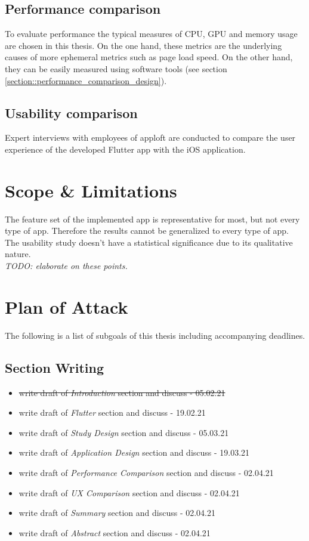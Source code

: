 \subsection{Performance comparison}
To evaluate performance the typical measures of CPU, GPU and memory usage are chosen in this thesis. 
On the one hand, these metrics are the underlying causes of more ephemeral metrics such as page load speed. 
On the other hand, they can be easily measured using software tools (see section \ref{section::performance_comparison_design}).

\subsection{Usability comparison}
Expert interviews with employees of apploft are conducted to compare the user experience of the developed Flutter app with the iOS application.

\section{Scope \& Limitations}
The feature set of the implemented app is representative for most, but not every type of app. Therefore the results cannot be generalized to 
every type of app.\\
The usability study doesn't have a statistical significance due to its qualitative nature.\\
\textit{TODO: elaborate on these points.}

\section{Plan of Attack}
\label{section:planofattack}
The following is a list of subgoals of this thesis including accompanying deadlines.

\subsection{Section Writing}
\begin{itemize}
    \item \sout{write draft of \textit{Introduction} section and discuss - 05.02.21}
    \item write draft of \textit{Flutter} section and discuss - 19.02.21
    \item write draft of \textit{Study Design} section and discuss - 05.03.21
    \item write draft of \textit{Application Design} section and discuss - 19.03.21
    \item write draft of \textit{Performance Comparison} section and discuss - 02.04.21
    \item write draft of \textit{UX Comparison} section and discuss - 02.04.21
    \item write draft of \textit{Summary} section and discuss - 02.04.21
    \item write draft of \textit{Abstract} section and discuss - 02.04.21
\end{itemize}


